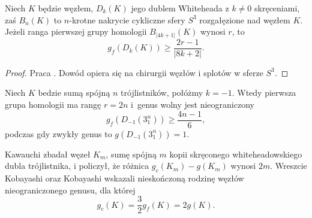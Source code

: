 \begin{proposition}
    Niech $K$ będzie węzłem, $D_k(K)$ jego dublem Whiteheada z $k \neq 0$ skręceniami, zaś $B_n(K)$ to $n$-krotne nakrycie cykliczne sfery $S^3$ rozgałęzione nad węzłem $K$.
    Jeżeli ranga pierwszej grupy homologii $B_{|4k+1|}(K)$ wynosi $r$, to
    \begin{equation}
        g_f(D_k(K)) \ge \frac {2r-1} {|8k+2|}.
    \end{equation}
\end{proposition}

\begin{proof}
    Praca \cite{moriah87}.
    Dowód opiera się na chirurgii węzłów i splotów w sferze $S^3$.
\end{proof}

\begin{corollary}
    Niech $K$ bedzie sumą spójną $n$ trójlistników, połóżmy $k = -1$.
    Wtedy pierwsza grupa homologii ma rangę $r = 2n$ i~genus wolny jest nieograniczony
    \begin{equation}
        g_f(D_{-1}(3_1^n)) \ge \frac {4n-1} {6},
    \end{equation}
    podczas gdy zwykły genus to $g(D_{-1}(3_1^n)) = 1$.
\end{corollary}

Kawauchi \cite{kawauchi94} zbadał węzeł $K_m$, sumę spójną $m$ kopii skręconego whiteheadowskiego dubla trójlistnika, i policzył, że różnica $g_c(K_m) - g(K_m)$ wynosi $2m$.
%
Wreszcie Kobayashi oraz Kobayashi \cite{kobayashi96} wskazali nieskończoną rodzinę węzłów nieograniczonego genusu, dla której
%
%
\begin{equation}
    g_c(K) = \frac 32 g_f(K) = 2g(K).
\end{equation}

